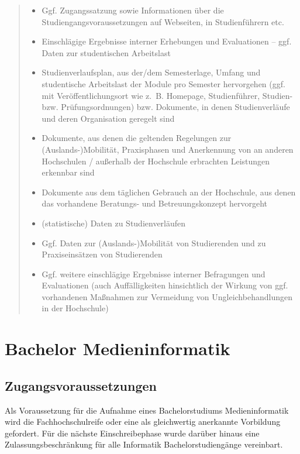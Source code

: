 \begin{quote}
\begin{itemize}
\item
  Ggf. Zugangssatzung sowie Informationen über die
  Studiengangsvoraussetzungen auf Webseiten, in Studienführern etc.
\item
  Einschlägige Ergebnisse interner Erhebungen und Evaluationen -- ggf.
  Daten zur studentischen Arbeitslast
\item
  Studienverlaufsplan, aus der/dem Semesterlage, Umfang und studentische
  Arbeitslast der Module pro Semester hervorgehen (ggf. mit
  Veröffentlichungsort wie z.~B. Homepage, Studienführer, Studien- bzw.
  Prüfungsordnungen) bzw. Dokumente, in denen Studienverläufe und deren
  Organisation geregelt sind
\item
  Dokumente, aus denen die geltenden Regelungen zur
  (Auslands-)Mobilität, Praxisphasen und Anerkennung von an anderen
  Hochschulen / außerhalb der Hochschule erbrachten Leistungen erkennbar
  sind
\item
  Dokumente aus dem täglichen Gebrauch an der Hochschule, aus denen das
  vorhandene Beratungs- und Betreuungskonzept hervorgeht
\item
  (statistische) Daten zu Studienverläufen
\item
  Ggf. Daten zur (Auslands-)Mobilität von Studierenden und zu
  Praxiseinsätzen von Studierenden
\item
  Ggf. weitere einschlägige Ergebnisse interner Befragungen und
  Evaluationen (auch Auffälligkeiten hinsichtlich der Wirkung von ggf.
  vorhandenen Maßnahmen zur Vermeidung von Ungleichbehandlungen in der
  Hochschule)
\end{itemize}
\end{quote}

\section{Bachelor
Medieninformatik}\label{bachelor-medieninformatik-1}

\subsection{Zugangsvoraussetzungen}\label{zugangsvoraussetzungen}

Als Voraussetzung für die Aufnahme eines Bachelorstudiums
Medieninformatik wird die Fachhochschulreife oder eine als gleichwertig
anerkannte Vorbildung gefordert. Für die nächste Einschreibephase wurde
darüber hinaus eine Zulassungsbeschränkung für alle Informatik
Bachelorstudiengänge vereinbart.

